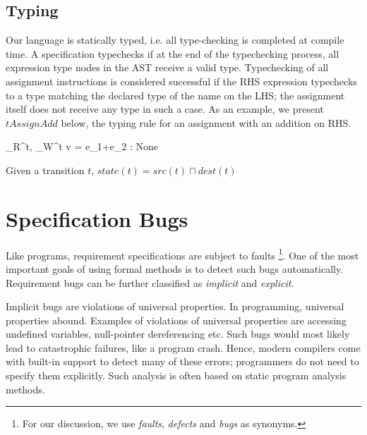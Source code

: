 \documentclass[12pt,a4paper]{report}
\begin{document}
\subsection{Typing}
Our language is statically typed, i.e. all type-checking is completed at compile time. A specification typechecks if at the end of the typechecking process, all expression type nodes in the AST receive a valid type. Typechecking of all assignment instructions is considered successful if the RHS expression typechecks to a type matching the declared type of the name on the LHS; the assignment itself does not receive any type in such a case. As an example, we present $tAssignAdd$ below, the typing rule for an assignment with an addition on RHS.

\begin{center}
\begin{minipage}{0.3\textwidth}
{\sigma_R^t, \sigma_W^t \vdash v = e_1+e_2 : None}
\end{minipage}
\end{center}

\vspace{1cm}
\begin{myrule} \label{r:tp}
	Given a transition $t$, $state(t) = src(t) \sqcap dest(t)$ 
\end{myrule}


\section{Specification Bugs} \label{s:sb}
Like programs, requirement specifications are subject to faults \footnote{For our discussion, we use \emph{faults}, \emph{defects} and \emph{bugs} as synonyms.}. One of the most important goals of using formal methods is to detect such bugs automatically. Requirement bugs can be further classified as \emph{implicit} and \emph{explicit}.

Implicit bugs are violations of universal properties. In programming, universal properties abound. Examples of violations of universal properties are accessing undefined variables, null-pointer dereferencing etc. Such bugs would most likely lead to catastrophic failures, like a program crash. Hence, modern compilers come with built-in support to detect many of these errors; programmers do not need to specify them explicitly. Such analysis is often based on static program analysis methods.
\end{document}
